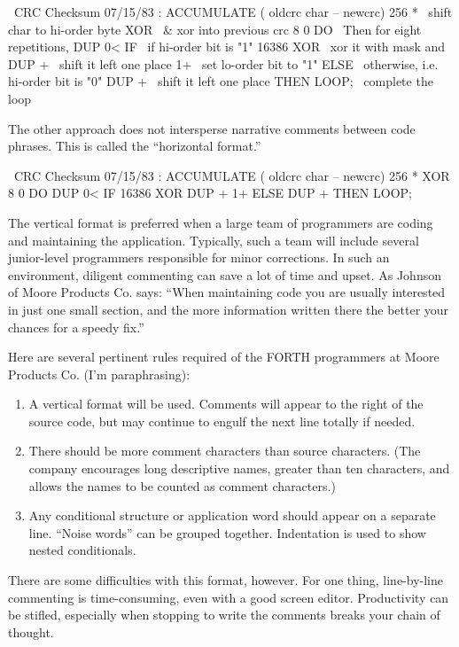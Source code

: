 \begin{Code}
\ CRC Checksum                             07/15/83
: ACCUMULATE    ( oldcrc char -- newcrc)
    256 *              \ shift char to hi-order byte
    XOR                \ & xor into previous crc
    8 0 DO             \ Then for eight repetitions,
       DUP 0< IF     \ if hi-order bit is "1"
          16386 XOR    \ xor it with mask and
          DUP +        \ shift it left one place
          1+           \ set lo-order bit to "1"
             ELSE      \ otherwise, i.e. hi-order bit is "0"
          DUP +        \ shift it left one place
             THEN
       LOOP;           \ complete the loop
\end{Code}
The other approach does not intersperse narrative comments between
code phrases.  This is called the ``horizontal format.''
\begin{Code}
\ CRC Checksum                             07/15/83
: ACCUMULATE    ( oldcrc char -- newcrc)
    256 *  XOR  8 0 DO  DUP 0< IF
       16386 XOR  DUP +  1+  ELSE  DUP +  THEN  LOOP;
\end{Code}

The vertical format is preferred when a large team of programmers are
coding and maintaining the application.  Typically, such a team will include
several junior-level programmers responsible for minor corrections.
In such an environment, diligent commenting can save a lot of time and
upset.  As Johnson of Moore Products Co. says: ``When maintaining code
you are usually interested in just one small section, and the more information
written there the better your chances for a speedy fix.''

Here are several pertinent rules required of the FORTH programmers
at Moore Products Co. (I'm paraphrasing):
\begin{enumerate}
\item A vertical format will be used.  Comments will appear to the right of the
source code, but may continue to engulf the next line totally if needed.
\item There should be more comment characters than source characters.  (The
company encourages long descriptive names, greater than ten characters,
and allows the names to be counted as comment characters.)
\item Any conditional structure or application word should appear on a separate
line.  ``Noise words'' can be grouped together.  Indentation is used to show
nested conditionals.
\end{enumerate}
There are some difficulties with this format, however.  For one thing, line-by-line
commenting is time-consuming, even with a good screen editor.
Productivity can be stifled, especially when stopping to write the comments
breaks your chain of thought.

